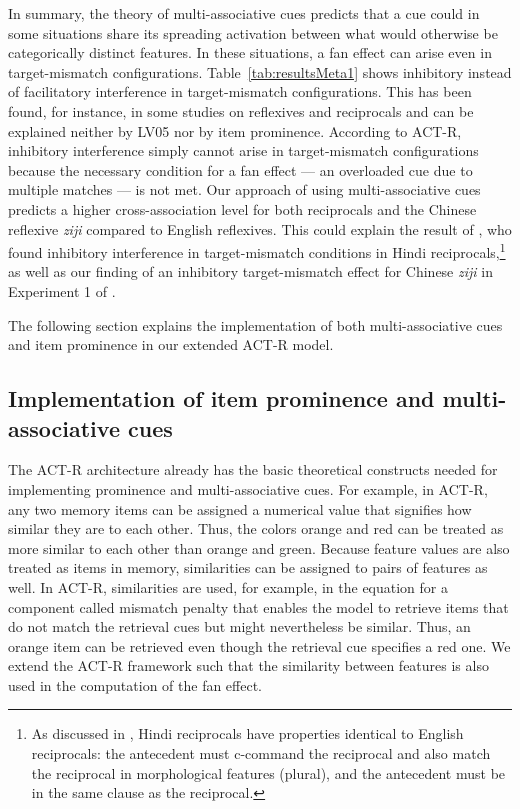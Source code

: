 \documentclass{cambridge7A}\usepackage[]{graphicx}\usepackage[]{color}
\begin{document}
In summary, the theory of multi-associative cues predicts that a cue could in some situations share its spreading activation between what would otherwise be categorically distinct features. In these situations, a fan effect can arise even in target-mismatch configurations. 
Table~\ref{tab:resultsMeta1} shows inhibitory instead of facilitatory interference in target-mismatch configurations. This has been found, for instance, in some studies on reflexives and reciprocals and can be explained neither by LV05 nor by item prominence. 
According to ACT-R, inhibitory interference simply cannot arise in target-mismatch configurations because the necessary condition for a fan effect --- an overloaded cue due to multiple matches --- is not met. Our approach of using  multi-associative cues predicts a higher cross-association level for both reciprocals and the Chinese reflexive  \textit{ziji} compared to English reflexives. This could explain the result of \cite{KushPhillips2014}, who found inhibitory interference in target-mismatch conditions in Hindi reciprocals,\footnote{As discussed in \cite{KushPhillips2014}, Hindi reciprocals have properties identical to English reciprocals: the antecedent must c-command the reciprocal and also match the reciprocal in morphological features (plural), and the antecedent must be in the same clause as the reciprocal.} 
as well as our finding of an inhibitory target-mismatch effect for Chinese \textit{ziji} in Experiment 1 of \cite{JaegerEngelmannVasishth2015}.

The following section explains the implementation of both multi-associative cues and item prominence in our extended ACT-R model.

\subsection{Implementation of item prominence and multi-associative cues}
\label{sec:impl}

The ACT-R architecture already has the basic theoretical constructs needed for implementing  prominence and  multi-associative cues.
For example, in ACT-R, any two memory items can be assigned a numerical value that signifies how similar they are to each other. Thus, the colors orange and red can be treated as more similar to each other than orange and green. Because feature values  are also treated as items in memory, similarities can be assigned to pairs of features as well.
In ACT-R, similarities are used, for example, in the equation for a component called  mismatch penalty that enables the model to retrieve items that do not match the retrieval cues but might nevertheless be similar. Thus, an orange item can be retrieved even though the retrieval cue specifies a red one.
We extend the ACT-R framework such that the similarity between features is also used in the computation of the fan effect. 
\end{document}
